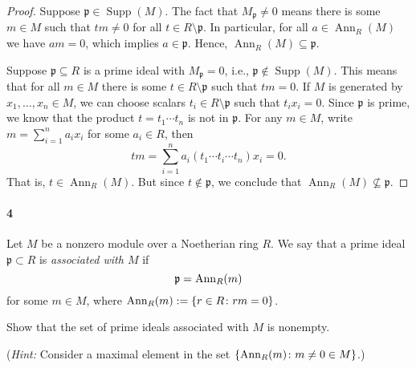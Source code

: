 \documentclass[12pt]{article}
\newlength{\myparskip}
\newenvironment{fullbox}{\begin{lrbox}{\savefullbox}\begin{minipage}{\dimexpr\textwidth-2\fboxsep\relax}\setlength{\parskip}{\myparskip}}{\end{minipage}\end{lrbox}\framebox[\textwidth]{\usebox{\savefullbox}}}
\newenvironment{pbox}[1][]{\begin{fullbox}\ifx#1\empty\else\paragraph{#1}\phantom{}\fi}{\end{fullbox}}
\theoremstyle{definition}
\newcommand{\<}{\langle}
\renewcommand{\>}{\rangle}
\newcommand{\seq}{\subseteq}
\newcommand{\pp}{\mathfrak{p}}
\DeclareMathOperator{\Supp}{Supp}
\DeclareMathOperator{\Ann}{Ann}
\begin{document}
\begin{proof}
    Suppose $\pp \in \Supp(M)$.
    The fact that $M_\pp \ne 0$ means there is some $m \in M$ such that $tm \ne 0$ for all $t \in R \setminus \pp$.
    In particular, for all $a \in \Ann_R(M)$ we have $am = 0$, which implies $a \in \pp$.
    Hence, $\Ann_R(M) \seq \pp$.

    Suppose $\pp \seq R$ is a prime ideal with $M_\pp = 0$, i.e., $\pp \notin \Supp(M)$.
    This means that for all $m \in M$ there is some $t \in R \setminus \pp$ such that $tm = 0$.
    If $M$ is generated by $x_1, \dots, x_n \in M$, we can choose scalars $t_i \in R \setminus \pp$ such that $t_ix_i = 0$.
    Since $\pp$ is prime, we know that the product $t = t_1 \cdots t_n$ is not in $\pp$.
    For any $m \in M$, write $m = \sum_{i=1}^{n} a_ix_i$ for some $a_i \in R$, then
    \[
        tm = \sum_{i=1}^{n} a_i(t_1 \cdots t_i \cdots t_n)x_i = 0.
    \]
    That is, $t \in \Ann_R(M)$.
    But since $t \notin \pp$, we conclude that $\Ann_R(M) \nsubseteq \pp$.
\end{proof}

\newpage
\begin{pbox}[4]
    Let $M$ be a nonzero module over a Noetherian ring $R$. We say that a prime ideal $\mathfrak{p}\subset R$ is \emph{associated with $M$} if
    \[
    \mathfrak{p}={\rm Ann}_R(m)
    \]
    for some $m\in M$, where ${\rm Ann}_R(m):=\{r\in R\colon rm=0\}$.

    Show that the set of prime ideals associated with $M$ is nonempty.

    \noindent
    (\emph{Hint:} Consider a maximal element in the set $\{{\rm Ann}_R(m)\colon m\neq 0\in M\}$.)
\end{pbox}
\end{document}
